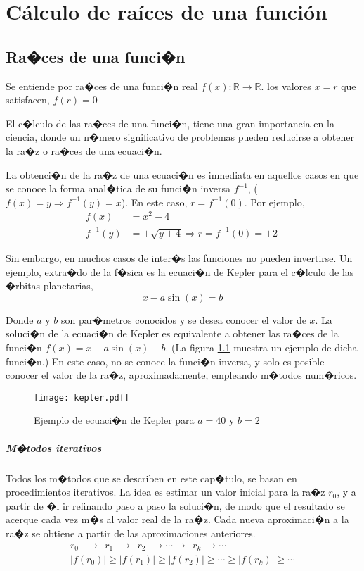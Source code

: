 \chapter{Cálculo de raíces de una función}

\section{Ra�ces de una funci�n}
Se entiende por ra�ces de una funci�n real $f(x):\mathbb{R} \rightarrow \mathbb{R}$. los valores $x=r$ que satisfacen, $f(r)=0$

El c�lculo de las ra�ces de una funci�n, tiene una gran importancia en la ciencia, donde un n�mero significativo de problemas pueden reducirse a obtener la ra�z o ra�ces de una ecuaci�n.

La obtenci�n de la ra�z de una ecuaci�n es inmediata en aquellos casos en que se conoce la forma anal�tica de su funci�n inversa $f^{-1}$, ($f(x)=y\Rightarrow f^{-1}(y)=x$). En este caso, $r=f^{-1}(0)$. Por ejemplo,
\begin{align*}
f(x)&=x^2-4\\
f^{-1}(y)&=\pm\sqrt{y+4}\Rightarrow r=f^{-1}(0)=\pm 2\
\end{align*}

Sin embargo, en muchos casos de inter�s las funciones no pueden invertirse.  Un ejemplo, extra�do de la f�sica es la ecuaci�n de Kepler para el c�lculo de las �rbitas planetarias,
\begin{equation*}
x-a\sin(x)=b
\end{equation*}

Donde $a$ y $b$ son par�metros conocidos y se desea conocer el valor de $x$. La soluci�n de la ecuaci�n de Kepler es equivalente a obtener las ra�ces de la funci�n $f(x)=x-a\sin(x)-b$. (La figura \ref{fig:kepler} muestra un ejemplo de dicha funci�n.) En este caso, no se conoce la funci�n inversa, y solo es posible conocer el valor de la ra�z, aproximadamente, empleando m�todos num�ricos.
\begin{figure}[h]
\centering
		\texttt{[image: kepler.pdf]}
	\caption{Ejemplo de ecuaci�n de Kepler para $a=40$ y $b=2$}
	\label{fig:kepler}
\end{figure}

\paragraph*{M�todos iterativos}Todos los m�todos que se describen en este cap�tulo, se basan en procedimientos iterativos. La idea es estimar un valor inicial para la ra�z $r_0$, y a partir de �l ir refinando paso a paso la soluci�n, de modo que el resultado se acerque cada vez m�s al valor real de la ra�z. Cada nueva aproximaci�n a la ra�z se obtiene a partir de las aproximaciones anteriores. 
\begin{align*}
r_0\ \ \  \rightarrow \  \ r_1  \ \ \rightarrow \ \ r_2 \ \ \rightarrow \cdots \rightarrow \ \ r_k \ \rightarrow \cdots\\
\vert f(r_0)\vert \ge \vert f(r_1)\vert \ge \vert f(r_2)\vert \ge \cdots \ge \vert f(r_k)\vert \ge \cdots
\end{align*}

